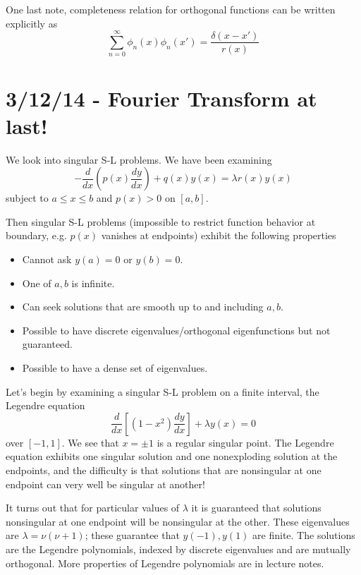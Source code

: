 \documentclass[10pt]{report}
\newcommand{\rd}[2]{\frac{d#1}{d#2}}
\begin{document}
One last note, completeness relation for orthogonal functions can be written explicitly as
\begin{equation}
    \sum_{n=0}^{\infty}\phi_n(x)\phi_n(x') = \frac{\delta(x-x')}{r(x)}
\end{equation}

\chapter{3/12/14 - Fourier Transform at last!}

We look into singular S-L problems. We have been examining
\begin{equation}
    -\rd{}{x}\left( p(x)\rd{y}{x} \right) + q(x)y(x) = \lambda r(x)y(x)
\end{equation}
subject to $a \leq x \leq b$ and $p(x) > 0$ on $[a,b]$. 

Then singular S-L problems (impossible to restrict function behavior at boundary, e.g. $p(x)$ vanishes at endpoints) exhibit the following properties
\begin{itemize}
    \item Cannot ask $y(a) = 0$ or $y(b) = 0$.
    \item One of $a,b$ is infinite.
    \item Can seek solutions that are smooth up to and including $a,b$.
    \item Possible to have discrete eigenvalues/orthogonal eigenfunctions but not guaranteed.
    \item Possible to have a dense set of eigenvalues. 
\end{itemize}

Let's begin by examining a singular S-L problem on a finite interval, the Legendre equation
\begin{equation}
    \rd{}{x}\left[ (1-x^2) \rd{y}{x} \right] + \lambda y(x) = 0
\end{equation}
over $[-1,1]$. We see that $x=\pm 1$ is a regular singular point. The Legendre equation exhibits one singular solution and one nonexploding solution at the endpoints, and the difficulty is that solutions that are nonsingular at one endpoint can very well be singular at another!

It turns out that for particular values of $\lambda$ it is guaranteed that solutions nonsingular at one endpoint will be nonsingular at the other. These eigenvalues are $\lambda = \nu(\nu + 1)$; these guarantee that $y(-1), y(1)$ are finite. The solutions are the Legendre polynomials, indexed by discrete eigenvalues and are mutually orthogonal. More properties of Legendre polynomials are in lecture notes.
\end{document}
